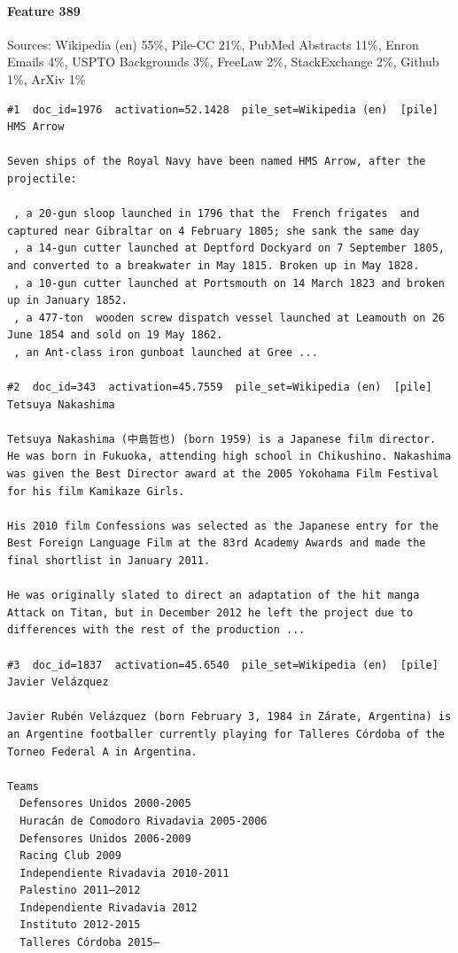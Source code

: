 \paragraph*{Feature 389} Sources: Wikipedia (en) 55\%, Pile-CC 21\%, PubMed Abstracts 11\%, Enron Emails 4\%, USPTO Backgrounds 3\%, FreeLaw 2\%, StackExchange 2\%, Github 1\%, ArXiv 1\%

\begin{verbatim}
#1  doc_id=1976  activation=52.1428  pile_set=Wikipedia (en)  [pile]
HMS Arrow

Seven ships of the Royal Navy have been named HMS Arrow, after the projectile:

 , a 20-gun sloop launched in 1796 that the  French frigates  and  captured near Gibraltar on 4 February 1805; she sank the same day
 , a 14-gun cutter launched at Deptford Dockyard on 7 September 1805, and converted to a breakwater in May 1815. Broken up in May 1828.
 , a 10-gun cutter launched at Portsmouth on 14 March 1823 and broken up in January 1852.
 , a 477-ton  wooden screw dispatch vessel launched at Leamouth on 26 June 1854 and sold on 19 May 1862.
 , an Ant-class iron gunboat launched at Gree ...

#2  doc_id=343  activation=45.7559  pile_set=Wikipedia (en)  [pile]
Tetsuya Nakashima

Tetsuya Nakashima (中島哲也) (born 1959) is a Japanese film director. He was born in Fukuoka, attending high school in Chikushino. Nakashima was given the Best Director award at the 2005 Yokohama Film Festival for his film Kamikaze Girls.

His 2010 film Confessions was selected as the Japanese entry for the Best Foreign Language Film at the 83rd Academy Awards and made the final shortlist in January 2011.

He was originally slated to direct an adaptation of the hit manga Attack on Titan, but in December 2012 he left the project due to differences with the rest of the production ...

#3  doc_id=1837  activation=45.6540  pile_set=Wikipedia (en)  [pile]
Javier Velázquez

Javier Rubén Velázquez (born February 3, 1984 in Zárate, Argentina) is an Argentine footballer currently playing for Talleres Córdoba of the Torneo Federal A in Argentina.

Teams
  Defensores Unidos 2000-2005
  Huracán de Comodoro Rivadavia 2005-2006
  Defensores Unidos 2006-2009
  Racing Club 2009
  Independiente Rivadavia 2010-2011
  Palestino 2011–2012
  Independiente Rivadavia 2012
  Instituto 2012-2015
  Talleres Córdoba 2015–


\end{verbatim}

